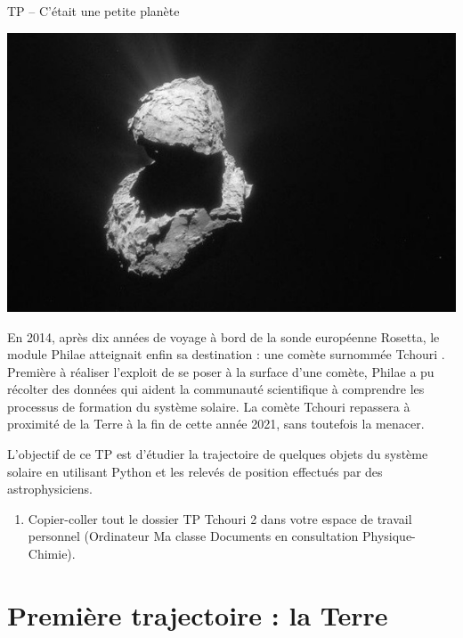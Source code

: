 \documentclass[12pt,a4paper]{article}
\begin{document}
\begin{header}
TP -- C'était une petite planète
\end{header}

\begin{multicols}{2}
\begin{center}
\includegraphics[width=\linewidth]{images/tchouri3.jpg}
\end{center}

En 2014, après dix années de voyage à bord de la sonde européenne Rosetta, le module Philae atteignait enfin sa destination : une comète surnommée \og Tchouri \fg{}.
Première à réaliser l'exploit de se poser à la surface d'une comète, Philae a pu récolter des données qui aident la communauté scientifique à comprendre les processus de formation du système solaire.
La comète Tchouri repassera à proximité de la Terre à la fin de cette année 2021, sans toutefois la menacer.
\end{multicols}

L'objectif de ce TP est d'étudier la trajectoire de quelques objets du système solaire en utilisant Python et les relevés de position effectués par des astrophysiciens.

\begin{enumerate}
\item \rea{}

Copier-coller tout le dossier \og TP Tchouri 2 \fg{} dans votre espace de travail personnel (Ordinateur \textrightarrow{} Ma classe \textrightarrow{} Documents en consultation \textrightarrow{} Physique-Chimie).
\end{enumerate}

\section*{Première trajectoire : la Terre}
\end{document}
